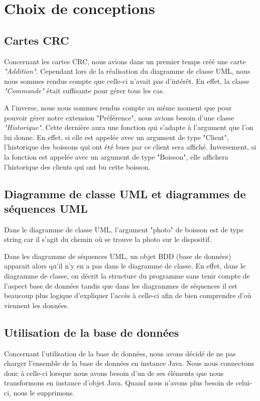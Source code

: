 \documentclass[11pt, a4, oneside, headings=normal]{scrreprt}
\begin{document}
\section*{Choix de conceptions}

\subsection*{Cartes CRC}

Concernant les cartes CRC, nous avions dans un premier temps créé une carte \textit{"Addition"}. Cependant lors de la réalisation du diagramme de classe UML, nous nous sommes rendus compte que celle-ci n'avait pas d'intérêt. En effet, la classe \textit{"Commande"} était suffisante pour gérer tous les cas.

A l'inverse, nous nous sommes rendus compte au même moment que pour pouvoir gérer notre extension "Préférence", nous avions besoin d'une classe \textit{"Historique"}. Cette dernière aura une fonction qui s'adapte à l'argument que l'on lui donne. En effet, si elle est appelée avec un argument de type "Client", l'historique des boissons qui ont été bues par ce client sera affiché. Inversement, si la fonction est appelée avec un argument de type "Boisson", elle affichera l'historique des clients qui ont bu cette boisson.

\subsection*{Diagramme de classe UML et diagrammes de séquences UML}

Dans le diagramme de classe UML, l'argument "photo" de boisson est de type string car il s'agit du chemin où se trouve la photo sur le dispositif.

Dans les diagramme de séquences UML, un objet BDD (base de données) apparait alors qu'il n'y en a pas dans le diagramme de classe.
En effet, dans le diagramme de classe, on décrit la structure du programme sans tenir compte de l'aspect base de données tandis que dans les diagrammes de séquences il est beaucoup plus logique d'expliquer l'accès à celle-ci afin de bien comprendre d'où viennent les données.

\subsection*{Utilisation de la base de données}

Concernant l'utilisation de la base de données, nous avons décidé de ne pas charger l'ensemble de la base de données en instance Java. Nous nous connectons donc à celle-ci lorsque nous avons besoin d'un de ses éléments que nous transformons en instance d'objet Java. Quand nous n'avons plus besoin de celui-ci, nous le supprimons.
\end{document}

